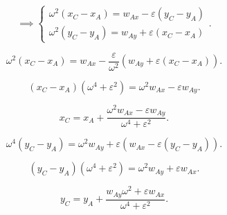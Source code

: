 \documentclass[a4paper,12pt]{report}
\begin{document}
\begin{enumerate}
\[
\implies
\begin{cases}
  \omega^2 (x_C - x_A) = w_{Ax} - \varepsilon(y_C - y_A) \\
  \omega^2 (y_C - y_A) = w_{Ay} + \varepsilon(x_C - x_A)
\end{cases}
.\] 

\[
  \omega^2 (x_C - x_A) = w_{Ax} - \frac{\varepsilon}{\omega^2}
  (w_{Ay} + \varepsilon(x_C - x_A))
.\] 

\[
  (x_C - x_A)\left( \omega^4 + \varepsilon^2 \right) =
  \omega^2 w_{Ax} - \varepsilon w_{Ay}
.\] 

\[
  \boxed{ x_C = x_A + \frac{\omega^2 w_{Ax} - \varepsilon w_{Ay}}
  {\omega^4 + \varepsilon^2}}
.\] 

\[
  \omega^4 (y_C - y_A) = \omega^2 w_{Ay} + \varepsilon
  (w_{Ax} - \varepsilon (y_C - y_A))
.\] 

\[
  (y_C - y_A) \left( \omega^4 + \varepsilon^2 \right)  = \omega^2 w_{Ay} + \varepsilon w_{Ax}
.\] 

\[
  \boxed{ y_C = y_A + \frac{w_{Ay} \omega^2 + \varepsilon w_{Ax}}{\omega^4 + \varepsilon^2}}
.\] 

\end{enumerate}
\end{document}
